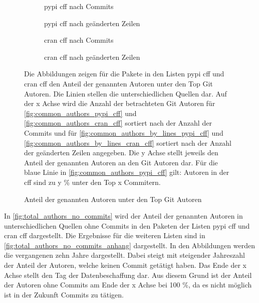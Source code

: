 \begin{figure}
    \begin{subfigure}{.5\textwidth}
        \centering
        
        \caption{\gls{pypi} \gls{cff} nach Commits}
        \label{fig:common_authors_2_pypi_cff}
    \end{subfigure}%
    \begin{subfigure}{.5\textwidth}
        \centering
        
        \caption{\gls{pypi} \gls{cff} nach geänderten Zeilen}
        \label{fig:common_authors_2_by_lines_pypi_cff}
    \end{subfigure}
    \begin{subfigure}{.5\textwidth}
        \centering
        
        \caption{\gls{cran} \gls{cff} nach Commits}
        \label{fig:common_authors_2_cran_cff}
    \end{subfigure}%
    \begin{subfigure}{.5\textwidth}
        \centering
        
        \caption{\gls{cran} \gls{cff} nach geänderten Zeilen}
        \label{fig:common_authors_2_by_lines_cran_cff}
    \end{subfigure}
    \caption{Anteil der genannten Autoren unter den Top Git Autoren}
    \label{fig:common_authors_2}
    \small
    \raggedright
    Die Abbildungen zeigen für die Pakete in den Listen \gls{pypi} \gls{cff} und \gls{cran} \gls{cff} den Anteil der genannten Autoren unter den Top Git Autoren. Die Linien stellen die unterschiedlichen Quellen dar. Auf der x Achse wird die Anzahl der betrachteten Git Autoren für \autoref{fig:common_authors_pypi_cff} und \autoref{fig:common_authors_cran_cff} sortiert nach der Anzahl der Commits und für \autoref{fig:common_authors_by_lines_pypi_cff} und \autoref{fig:common_authors_by_lines_cran_cff} sortiert nach der Anzahl der geänderten Zeilen angegeben. Die y Achse stellt jeweils den Anteil der genannten Autoren an den Git Autoren dar. Für die blaue Linie in \autoref{fig:common_authors_pypi_cff} gilt: Autoren in der \gls{cff} sind zu y \% unter den Top x Commitern.
\end{figure}

In \autoref{fig:total_authors_no_commits} wird der Anteil der genannten Autoren in unterschiedlichen Quellen ohne Commits in den Paketen der Listen \gls{pypi} \gls{cff} und \gls{cran} \gls{cff} dargestellt.
Die Ergebnisse für die weiteren Listen sind in \autoref{fig:total_authors_no_commits_anhang} dargestellt.
In den Abbildungen werden die vergangenen zehn Jahre dargestellt.
Dabei steigt mit steigender Jahreszahl der Anteil der Autoren, welche keinen Commit getätigt haben.
Das Ende der x Achse stellt den Tag der Datenbeschaffung dar.
Aus diesem Grund ist der Anteil der Autoren ohne Commits am Ende der x Achse bei 100 \%, da es nicht möglich ist in der Zukunft Commits zu tätigen.

